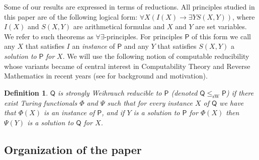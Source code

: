 \documentclass{article}
\newcommand{\Psf}{\mathsf{P}}
\newcommand{\Qsf}{\mathsf{Q}}
\newcommand{\ACA}[0]{\mathsf{ACA}}
\newcommand{\sW}{\mathrm{sW}}
\numberwithin{theorem}{section}
\newtheorem{definition}[theorem]{Definition}
\newcommand{\ludovic}[1]{\textcolor{blue}{#1}}
\newcommand{\lorenzo}[1]{\textcolor{orange}{#1}}
\begin{document}

Some of our results are expressed in terms of reductions. All principles studied in this paper are of the following logical form: $\forall X (I(X) \to \exists Y S(X,Y))$, where $I(X)$ and $S(X,Y)$ are arithmetical formulas and $X$ and $Y$ are set variables. We refer to such theorems as $\forall\exists$-principles. For principles $\Psf$ of this form we call any $X$ that satisfies $I$ an {\em instance} of $\Psf$ and any $Y$ that satisfies $S(X,Y)$ a {\em solution to} $\Psf$ {\em for} $X$.
We will use the following notion of computable reducibility whose variants became of central interest in Computability Theory and Reverse Mathematics in recent years (see \cite{Dza-Mum:22} for background and motivation).

\begin{definition}
    $\Qsf$ is {\em strongly Weihrauch reducible} to $\Psf$ (denoted $\Qsf \leq_{\sW} \Psf$) if there exist Turing functionals $\Phi$ and $\Psi$ such that for every instance $X$ of $\Qsf$ we have that $\Phi(X)$ is an instance of $\Psf$, and if $Y$ is a solution to $\Psf$ for $\Phi(X)$ then $\Psi(Y)$ is a solution to $\Qsf$ for $X$.
\end{definition}


\subsection{Organization of the paper}
\end{document}
